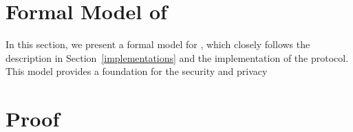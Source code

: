 \appendix

\section{Formal Model of \usso}
\label{appendix-model}

In this section, we present a formal model for \usso, which closely follows the description in Section~\ref{implementations} and the implementation of the protocol. This model provides a foundation for the security and privacy 

\section{Proof}
\label{appendix-security}